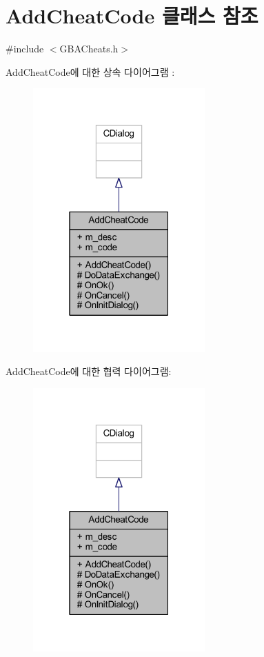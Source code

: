 \hypertarget{class_add_cheat_code}{}\section{Add\+Cheat\+Code 클래스 참조}
\label{class_add_cheat_code}


{\ttfamily \#include $<$G\+B\+A\+Cheats.\+h$>$}



Add\+Cheat\+Code에 대한 상속 다이어그램 \+: \nopagebreak
\begin{figure}[H]
\begin{center}
\leavevmode
\includegraphics[width=187pt]{class_add_cheat_code__inherit__graph}
\end{center}
\end{figure}


Add\+Cheat\+Code에 대한 협력 다이어그램\+:\nopagebreak
\begin{figure}[H]
\begin{center}
\leavevmode
\includegraphics[width=187pt]{class_add_cheat_code__coll__graph}
\end{center}
\end{figure}
